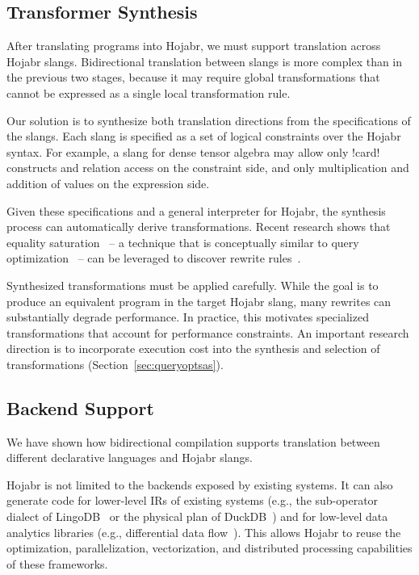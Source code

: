 \documentclass[sigconf,nonacm]{acmart}
\begin{document}
\subsection{Transformer Synthesis}
\label{sec:inslang}
After translating programs into Hojabr, we must support translation across Hojabr slangs. Bidirectional translation between slangs is more complex than in the previous two stages, because it may require global transformations that cannot be expressed as a single local transformation rule.

Our solution is to synthesize both translation directions from the specifications of the slangs. Each slang is specified as a set of logical constraints over the Hojabr syntax. For example, a slang for dense tensor algebra may allow only !card! constructs and relation access on the constraint side, and only multiplication and addition of values on the expression side.

Given these specifications and a general interpreter for Hojabr, the synthesis process can automatically derive transformations. Recent research shows that equality saturation~\cite{willsey2021egg,schneider2025slotted,tate2009equality} -- a technique that is conceptually similar to query optimization~\cite{schleich2023optimizing} -- can be leveraged to discover rewrite rules~\cite{nandi2021rewrite,pal2023equality}.

Synthesized transformations must be applied carefully. While the goal is to produce an equivalent program in the target Hojabr slang, many rewrites can substantially degrade performance. In practice, this motivates specialized transformations that account for performance constraints. An important research direction is to incorporate execution cost into the synthesis and selection of transformations (Section~\ref{sec:queryoptsas}).

\subsection{Backend Support}
\label{sec:backend}
We have shown how bidirectional compilation supports translation between different declarative languages and Hojabr slangs.

Hojabr is not limited to the backends exposed by existing systems. It can also generate code for lower-level IRs of existing systems (e.g., the sub-operator dialect of LingoDB~\cite{jungmair2023declarative} or the physical plan of DuckDB~\cite{raasveldt2019duckdb}) and for low-level data analytics libraries (e.g., differential data flow~\cite{mcsherry2013differential}). This allows Hojabr to reuse the optimization, parallelization, vectorization, and distributed processing capabilities of these frameworks.
\end{document}
